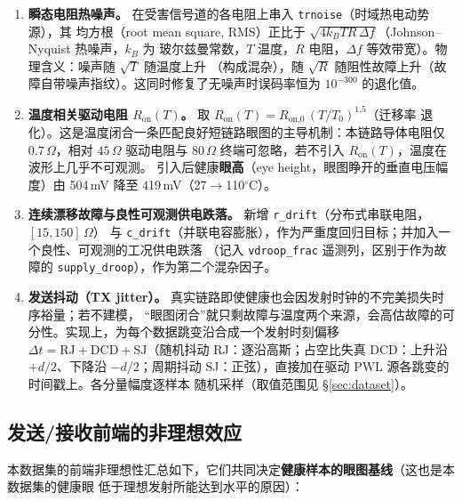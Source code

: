 \documentclass[11pt,a4paper,fontset=mac]{ctexart}
\newcommand{\term}[1]{\textbf{#1}}
\begin{document}
\begin{enumerate}
\item \textbf{瞬态电阻热噪声。} 在受害信号道的各电阻上串入 \texttt{trnoise}（时域热电动势源），其
均方根（root mean square, RMS）正比于 $\sqrt{4k_BTR\,\Delta f}$（Johnson--Nyquist 热噪声，$k_B$ 为
玻尔兹曼常数，$T$ 温度，$R$ 电阻，$\Delta f$ 等效带宽）。物理含义：噪声随 $\sqrt{T}$ 随温度上升
（构成混杂），随 $\sqrt{R}$ 随阻性故障上升（故障自带噪声指纹）。这同时修复了无噪声时误码率恒为
$10^{-300}$ 的退化值。
\item \textbf{温度相关驱动电阻 $R_\text{on}(T)$。} 取 $R_\text{on}(T)=R_\text{on,0}\,(T/T_0)^{1.5}$（迁移率
退化）。这是温度闭合一条匹配良好短链路眼图的主导机制：本链路导体电阻仅 $0.7\,\Omega$，相对
$45\,\Omega$ 驱动电阻与 $80\,\Omega$ 终端可忽略，若不引入 $R_\text{on}(T)$，温度在波形上几乎不可观测。
引入后健康\term{眼高}（eye height，眼图睁开的垂直电压幅度）由 504\,mV 降至 419\,mV（27$\to$110$^\circ$C）。
\item \textbf{连续漂移故障与良性可观测供电跌落。} 新增 \texttt{r\_drift}（分布式串联电阻，$[15,150]\,\Omega$）
与 \texttt{c\_drift}（并联电容膨胀），作为严重度回归目标；并加入一个良性、可观测的工况供电跌落
（记入 \texttt{vdroop\_frac} 遥测列，区别于作为故障的 \texttt{supply\_droop}），作为第二个混杂因子。
\item \textbf{发送抖动（TX jitter）。} 真实链路即使健康也会因发射时钟的不完美损失时序裕量；若不建模，
“眼图闭合”就只剩故障与温度两个来源，会高估故障的可分性。实现上，为每个数据跳变沿合成一个发射时刻偏移
$\Delta t = \mathrm{RJ} + \mathrm{DCD} + \mathrm{SJ}$（随机抖动 RJ：逐沿高斯；占空比失真 DCD：上升沿
$+d/2$、下降沿 $-d/2$；周期抖动 SJ：正弦），直接加在驱动 PWL 源各跳变的时间戳上。各分量幅度逐样本
随机采样（取值范围见 \S\ref{sec:dataset}）。
\end{enumerate}

\subsection{发送/接收前端的非理想效应}\label{sec:frontend}
本数据集的前端非理想性汇总如下，它们共同决定\textbf{健康样本的眼图基线}（这也是本数据集的健康眼
低于理想发射所能达到水平的原因）：
\end{document}
